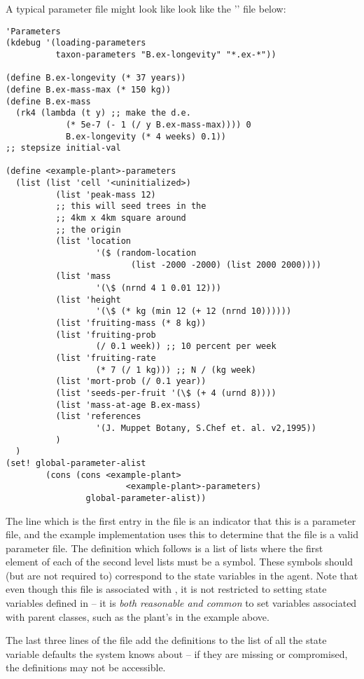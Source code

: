 A typical parameter file might look
like look like the '' file below:
\label{parameters}\label{kdebug}
\begin{verbatim}
'Parameters
(kdebug '(loading-parameters 
          taxon-parameters "B.ex-longevity" "*.ex-*"))

(define B.ex-longevity (* 37 years))
(define B.ex-mass-max (* 150 kg))
(define B.ex-mass
  (rk4 (lambda (t y) ;; make the d.e.
			(* 5e-7 (- 1 (/ y B.ex-mass-max)))) 0
			B.ex-longevity (* 4 weeks) 0.1))
;; stepsize initial-val

(define <example-plant>-parameters
  (list (list 'cell '<uninitialized>)
		  (list 'peak-mass 12)
		  ;; this will seed trees in the
		  ;; 4km x 4km square around
		  ;; the origin
		  (list 'location 
				  '($ (random-location
						 (list -2000 -2000) (list 2000 2000))))
		  (list 'mass
				  '(\$ (nrnd 4 1 0.01 12)))
		  (list 'height
				  '(\$ (* kg (min 12 (+ 12 (nrnd 10))))))
		  (list 'fruiting-mass (* 8 kg))
		  (list 'fruiting-prob
				  (/ 0.1 week)) ;; 10 percent per week
		  (list 'fruiting-rate
				  (* 7 (/ 1 kg))) ;; N / (kg week)
		  (list 'mort-prob (/ 0.1 year))
		  (list 'seeds-per-fruit '(\$ (+ 4 (urnd 8))))
		  (list 'mass-at-age B.ex-mass)
		  (list 'references
				  '(J. Muppet Botany, S.Chef et. al. v2,1995))
		  )
  )
(set! global-parameter-alist 
		(cons (cons <example-plant>
						<example-plant>-parameters) 
				global-parameter-alist))
\end{verbatim}

The  line which is the first entry in the file is
an indicator that this is a parameter file, and the example implementation 
uses this to determine that the file is a valid parameter file.
The definition which follows is a list of lists where the first
element of each of the second level lists must be a symbol.  These
symbols should (but are not required to) correspond to the state
variables in the agent. Note that even though this file is associated
with , it is not restricted to setting state
variables defined in  -- it is \emph{both reasonable
and common} to set variables associated with parent classes, such as
the plant's  in the example above.

The last three lines of the file add the definitions to the list of
all the state variable defaults the system knows about -- if they are
missing or compromised, the definitions may not be accessible.

